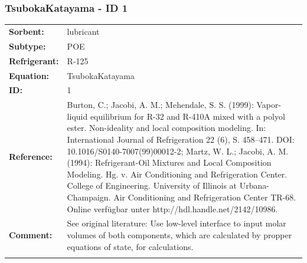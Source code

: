 \subsubsection{TsubokaKatayama - ID 1}
%
\begin{tabular}[l]{|lp{11.5cm}|}
\hline
\addlinespace

\textbf{Sorbent:} & lubricant \\
\textbf{Subtype:} & POE \\
\textbf{Refrigerant:} & R-125 \\
\textbf{Equation:} & TsubokaKatayama \\
\textbf{ID:} & 1 \\
\textbf{Reference:} & Burton, C.; Jacobi, A. M.; Mehendale, S. S. (1999): Vapor-liquid equilibrium for R-32 and R-410A mixed with a polyol ester. Non-ideality and local composition modeling. In: International Journal of Refrigeration 22 (6), S. 458–471. DOI: 10.1016/S0140-7007(99)00012-2; Martz, W. L.; Jacobi, A. M. (1994): Refrigerant-Oil Mixtures and Local Composition Modeling. Hg. v. Air Conditioning and Refrigeration Center. College of Engineering. University of Illinois at Urbana-Champaign. Air Conditioning and Refrigeration Center TR-68. Online verfügbar unter http://hdl.handle.net/2142/10986. \\
\textbf{Comment:} & See original literature: Use low-level interface to input molar volumes of both components, which are calculated by propper equations of state, for calculations. \\

\addlinespace
\hline
\end{tabular}
\newline

